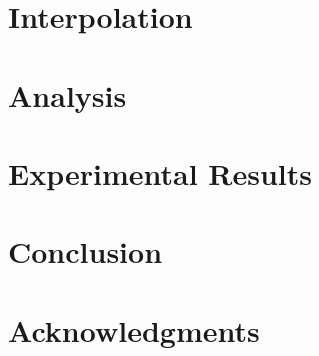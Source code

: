 \documentclass[journal]{IEEEtran}
\begin{document}
  \section{Interpolation} 
  

  \section{Analysis} 
  

  \section{Experimental Results} 
  

  \section{Conclusion} 
  

  \section*{Acknowledgments}
  

  \begingroup
    
    
  \endgroup
\end{document}
